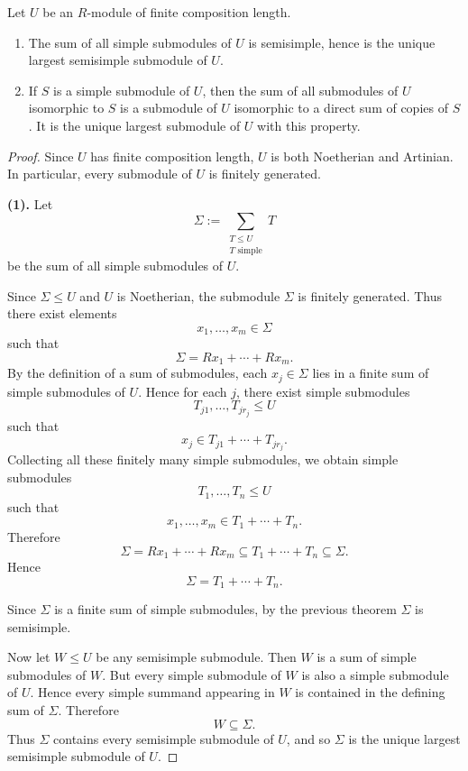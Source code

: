 \begin{corollary}
    Let $U$ be an $R$-module of finite composition length.
    \begin{enumerate}
        \item The sum of all simple submodules of $U$ is semisimple, hence is the unique
              largest semisimple submodule of $U$.
        \item If $S$ is a simple submodule of $U$, then the sum of all submodules of $U$ isomorphic to $S$ is a submodule of $U$ isomorphic to a direct sum of
              copies of $S$. It is the unique largest submodule of $U$ with this
              property.
    \end{enumerate}
\end{corollary}

\begin{proof}
    Since \(U\) has finite composition length, \(U\) is both Noetherian and Artinian.
    In particular, every submodule of \(U\) is finitely generated.

    \medskip

    \noindent
    \textbf{(1).} Let
    \[
        \Sigma := \sum_{\substack{T\leq U\\ T\text{ simple}}} T
    \]
    be the sum of all simple submodules of \(U\).

    Since \(\Sigma\leq U\) and \(U\) is Noetherian, the submodule \(\Sigma\) is finitely
    generated. Thus there exist elements
    \[
        x_1,\dots,x_m\in \Sigma
    \]
    such that
    \[
        \Sigma=Rx_1+\cdots+Rx_m.
    \]
    By the definition of a sum of submodules, each \(x_j\in\Sigma\) lies in a finite
    sum of simple submodules of \(U\). Hence for each \(j\), there exist simple
    submodules
    \[
        T_{j1},\dots,T_{jr_j}\leq U
    \]
    such that
    \[
        x_j\in T_{j1}+\cdots+T_{jr_j}.
    \]
    Collecting all these finitely many simple submodules, we obtain simple submodules
    \[
        T_1,\dots,T_n\leq U
    \]
    such that
    \[
        x_1,\dots,x_m\in T_1+\cdots+T_n.
    \]
    Therefore
    \[
        \Sigma
        =
        Rx_1+\cdots+Rx_m
        \subseteq
        T_1+\cdots+T_n
        \subseteq
        \Sigma.
    \]
    Hence
    \[
        \Sigma=T_1+\cdots+T_n.
    \]

    Since \(\Sigma\) is a finite sum of simple submodules, by the previous theorem
    \(\Sigma\) is semisimple.

    Now let \(W\leq U\) be any semisimple submodule. Then \(W\) is a sum of simple
    submodules of \(W\). But every simple submodule of \(W\) is also a simple submodule
    of \(U\). Hence every simple summand appearing in \(W\) is contained in the defining
    sum of \(\Sigma\). Therefore
    \[
        W\subseteq \Sigma.
    \]
    Thus \(\Sigma\) contains every semisimple submodule of \(U\), and so \(\Sigma\) is the
    unique largest semisimple submodule of \(U\).


\end{proof}
